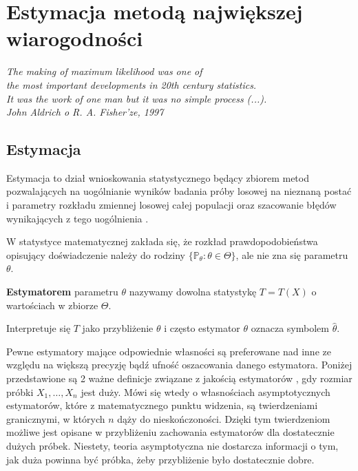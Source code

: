\chapter{Estymacja metodą największej wiarogodności}
\begin{flushright}
\textit{The making of maximum likelihood was one of \\
the most important developments in 20th century statistics. \\
It was the work of one man but it was no simple process (...). \\
John Aldrich o R. A. Fisher'ze, 1997 \cite{aldrich1}
}
\end{flushright}

\section{Estymacja}

Estymacja to dział wnioskowania statystycznego będący zbiorem metod pozwalających na uogólnianie wyników badania próby losowej na nieznaną postać i parametry rozkładu zmiennej losowej całej populacji oraz szacowanie błędów wynikających z tego uogólnienia \cite{wiki1}.

W statystyce matematycznej zakłada się, że rozkład prawdopodobieństwa
opisujący doświadczenie należy do rodziny $\{\mathbb{P}_{\theta} : \theta \in \Theta\}$, ale nie zna się
parametru $\theta$. 

\begin{definition}
\textbf{Estymatorem} parametru $\theta$ nazywamy dowolna statystykę
$T = T(X)$ o wartościach w zbiorze $\Theta$. 
\end{definition}

Interpretuje się $T$ jako przybliżenie $\theta$ i często estymator $\theta$ oznacza symbolem $\hat{\theta}$.

Pewne estymatory mające odpowiednie własności są preferowane nad inne ze względu na większą precyzję bądź ufność oszacowania danego estymatora. Poniżej przedstawione są 2 ważne definicje związane z jakością estymatorów \cite{niemiro}, gdy rozmiar próbki $X_1, \dots , X_n$ jest duży. Mówi się wtedy o własnościach asymptotycznych estymatorów, które z matematycznego punktu widzenia, są twierdzeniami
granicznymi, w których $n$ dąży do nieskończoności. Dzięki tym twierdzeniom możliwe jest opisane w przybliżeniu zachowania estymatorów dla dostatecznie dużych próbek. Niestety, teoria asymptotyczna nie dostarcza informacji o tym, jak duża powinna być próbka, żeby przybliżenie było dostatecznie dobre.

